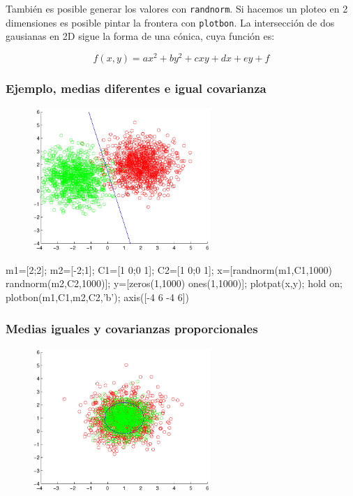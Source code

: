 \documentclass[11pt]{scrartcl}
\begin{document}
También es posible generar los valores con \texttt{randnorm}. Si hacemos un
ploteo en 2 dimensiones es posible pintar la frontera con \texttt{plotbon}. La
intersección de dos gausianas en 2D sigue la forma de una cónica, cuya función
es:

\[
f(x,y) = a x^2 + b y^2 + c x y + d x + e y + f
\]

\subsubsection{Ejemplo, medias diferentes e igual covarianza}

\begin{figure}[h!]
  \centering
  \includegraphics[width=0.6\textwidth]{img/bayes_2d_2}
  \label{Medias diferentes e igual covarianza}
\end{figure}

\begin{matlabcode}
m1=[2;2]; m2=[-2;1]; C1=[1 0;0 1]; C2=[1 0;0 1];
x=[randnorm(m1,C1,1000) randnorm(m2,C2,1000)];
y=[zeros(1,1000) ones(1,1000)];
plotpat(x,y);
hold on;
plotbon(m1,C1,m2,C2,'b');
axis([-4 6 -4 6])  
\end{matlabcode}

\subsubsection{Medias iguales y covarianzas proporcionales}

\begin{figure}[h!]
  \centering
  \includegraphics[width=0.6\textwidth]{img/bayes_2d_3}
  \label{Medias iguales y covarianzas proporcionales}
\end{figure}
\end{document}
